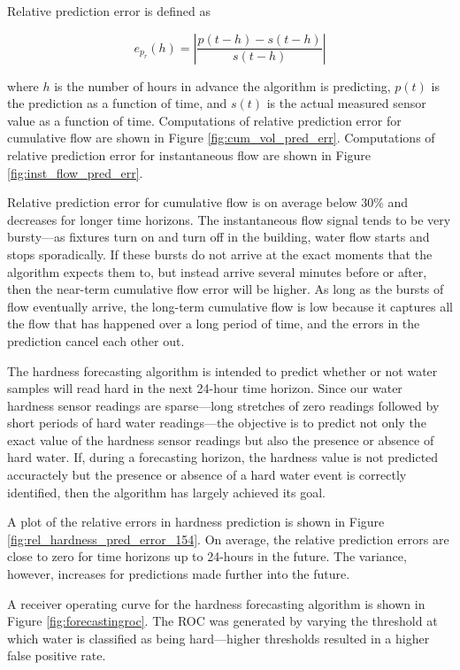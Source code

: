 Relative prediction error is defined as

\begin{equation*}
e_{p_r}(h) = \left| \frac{p(t-h)-s(t-h)}{s(t-h)} \right|
\end{equation*}

where $h$ is the number of hours in advance the algorithm is predicting, $p(t)$ is the prediction as a function of time, and $s(t)$ is the actual measured sensor value as a function of time.
 Computations of relative prediction error for cumulative flow are shown in Figure \ref{fig:cum_vol_pred_err}.
 Computations of relative prediction error for instantaneous flow are shown in Figure \ref{fig:inst_flow_pred_err}.

Relative prediction error for cumulative flow is on average below 30\% and decreases for longer time horizons.
 The instantaneous flow signal tends to be very bursty---as fixtures turn on and turn off in the building, water flow starts and stops sporadically.
 If these bursts do not arrive at the exact moments that the algorithm expects them to, but instead arrive several minutes before or after, then the near-term cumulative flow error will be higher.
 As long as the bursts of flow eventually arrive, the long-term cumulative flow is low because it captures all the flow that has happened over a long period of time, and the errors in the prediction cancel each other out.

The hardness forecasting algorithm is intended to predict whether or not water samples will read hard in the next 24-hour time horizon.
 Since our water hardness sensor readings are sparse---long stretches of zero readings followed by short periods of hard water readings---the objective is to predict not only the exact value of the hardness sensor readings but also the presence or absence of hard water.
 If, during a forecasting horizon, the hardness value is not predicted accuractely but the presence or absence of a hard water event is correctly identified, then the algorithm has largely achieved its goal.

A plot of the relative errors in hardness prediction is shown in Figure \ref{fig:rel_hardness_pred_error_154}.
 On average, the relative prediction errors are close to zero for time horizons up to 24-hours in the future.
 The variance, however, increases for predictions made further into the future.


A receiver operating curve for the hardness forecasting algorithm is shown in Figure \ref{fig:forecastingroc}.
 The ROC was generated by varying the threshold at which water is classified as being hard---higher thresholds resulted in a higher false positive rate.


